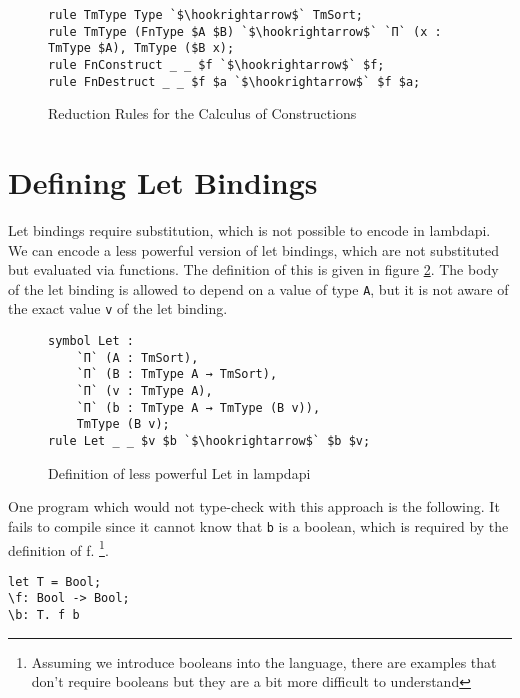 \begin{figure}[ht]
	\begin{lstlisting}
rule TmType Type `$\hookrightarrow$` TmSort;
rule TmType (FnType $A $B) `$\hookrightarrow$` `Π` (x : TmType $A), TmType ($B x);
rule FnConstruct _ _ $f `$\hookrightarrow$` $f;
rule FnDestruct _ _ $f $a `$\hookrightarrow$` $f $a;
	\end{lstlisting}
	\caption{Reduction Rules for the Calculus of Constructions}
	\label{fig:lp-rules}
\end{figure}

\section{\label{ch:comp-lambdapi:let}Defining Let Bindings}

Let bindings require substitution, which is not possible to encode in lambdapi. We can encode a less powerful version of let bindings, which are not substituted but evaluated via functions. The definition of this is given in figure \ref{fig:lp-let}. The body of the let binding is allowed to depend on a value of type \verb|A|, but it is not aware of the exact value \verb|v| of the let binding. 

\begin{figure}[ht]
	\begin{lstlisting}
symbol Let : 
	`Π` (A : TmSort), 
	`Π` (B : TmType A → TmSort), 
	`Π` (v : TmType A),
	`Π` (b : TmType A → TmType (B v)),
	TmType (B v);
rule Let _ _ $v $b `$\hookrightarrow$` $b $v;
	\end{lstlisting}
	\caption{Definition of less powerful Let in lampdapi}
	\label{fig:lp-let}
\end{figure}

One program which would not type-check with this approach is the following. It fails to compile since it cannot know that \verb|b| is a boolean, which is required by the definition of f. \footnote{Assuming we introduce booleans into the language, there are examples that don't require booleans but they are a bit more difficult to understand}.
\begin{lstlisting}
let T = Bool;
\f: Bool -> Bool;
\b: T. f b
\end{lstlisting}
